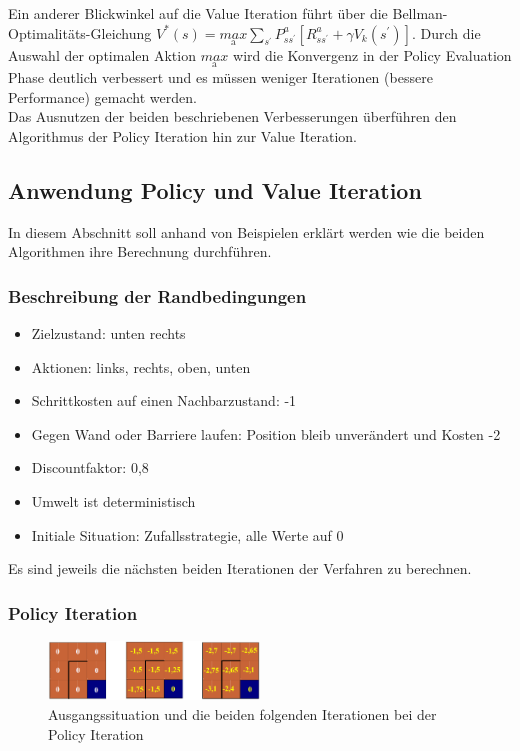 \documentclass[10pt]{scrartcl}
\begin{document}
Ein anderer Blickwinkel auf die Value Iteration führt über die Bellman-Optimalitäts-Gleichung $V^{*}(s) = \underset{\text{a}}{max} \sum_{s^{'}} P^a_{ss^{'}} [R^a_{ss^{'}} + \gamma V_{k} (s^{'})]$.
Durch die Auswahl der optimalen Aktion $\underset{\text{a}}{max}$ wird die Konvergenz in der Policy Evaluation Phase deutlich verbessert und es müssen weniger Iterationen (bessere Performance) gemacht werden.\\

Das Ausnutzen der beiden beschriebenen Verbesserungen überführen den Algorithmus der Policy Iteration hin zur Value Iteration. 

\subsection{Anwendung Policy und Value Iteration}
In diesem Abschnitt soll anhand von Beispielen erklärt werden wie die beiden Algorithmen ihre Berechnung durchführen.

\subsubsection{Beschreibung der Randbedingungen}
\begin{itemize}
	\item Zielzustand: unten rechts
	\item Aktionen: links, rechts, oben, unten
	\item Schrittkosten auf einen Nachbarzustand: -1
	\item Gegen Wand oder Barriere laufen: Position bleib unverändert und Kosten -2
	\item Discountfaktor: 0,8
	\item Umwelt ist deterministisch
	\item Initiale Situation: Zufallsstrategie, alle Werte auf 0
\end{itemize}

Es sind jeweils die nächsten beiden Iterationen der Verfahren zu berechnen.

\subsubsection{Policy Iteration}

\begin{figure}[htbp]
	\centering	\includegraphics[width=0.5\textwidth]{Bilder/PolicyIterationAufgabe}
	\caption{Ausgangssituation und die beiden folgenden Iterationen bei der Policy Iteration}
	\label{fig:policy_aufgabe}
\end{figure}
\end{document}
